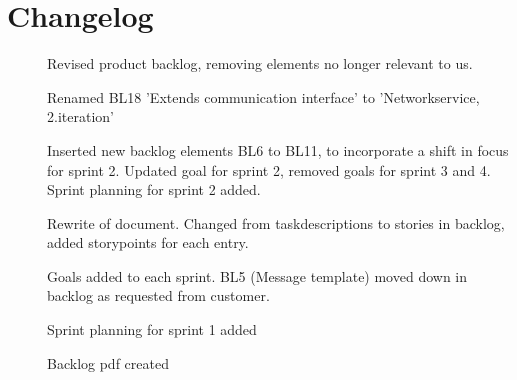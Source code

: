 \chapter{Changelog}
\begin{description}
			\item[] Revised product backlog, removing elements no longer relevant to us.
			\item[] Renamed BL18 'Extends communication interface' to 'Networkservice, 2.iteration'
			\item[] Inserted new backlog elements BL6 to BL11, to incorporate a shift in focus for sprint 2. Updated goal for sprint 2, removed goals for sprint 3 and 4. Sprint planning for sprint 2 added.
			\item[] Rewrite of document. Changed from taskdescriptions to stories in backlog, added storypoints for each entry. 
			\item[] Goals added to each sprint. BL5 (Message template) moved down in backlog as requested from customer.
			\item[] Sprint planning for sprint 1 added
			\item[] Backlog pdf created
		\end{description}